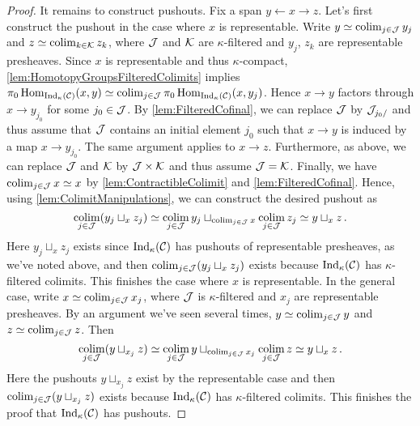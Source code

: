 \begin{proof}
	It remains to construct pushouts. Fix a span $y\leftarrow x\rightarrow z$. Let's first construct the pushout in the case where $x$ is representable. Write $y\simeq \operatorname*{colim}_{j\in\mathcal{J}} y_j$ and $z\simeq \operatorname*{colim}_{k\in\mathcal{K}}z_k$, where $\mathcal{J}$ and $\mathcal{K}$ are $\kappa$-filtered and $y_j$, $z_k$ are representable presheaves. Since $x$ is representable and thus $\kappa$-compact, \cref{lem:HomotopyGroupsFilteredColimits} implies  $\pi_0\operatorname{Hom}_{\mathrm{Ind}_\kappa(\mathcal{C})}(x,y)\simeq \operatorname*{colim}_{j\in\mathcal{J}}\pi_0\operatorname{Hom}_{\mathrm{Ind}_\kappa(\mathcal{C})}(x,y_j)$. Hence $x\rightarrow y$ factors through $x\rightarrow y_{j_0}$ for some $j_0\in \mathcal{J}$. By \cref{lem:FilteredCofinal}, we can replace $\mathcal{J}$ by $\mathcal{J}_{j_0/}$ and thus assume that $\mathcal{J}$ contains an initial element $j_0$ such that $x\rightarrow y$ is induced by a map $x\rightarrow y_{j_0}$. The same argument applies to $x\rightarrow z$. Furthermore, as above, we can replace $\mathcal{J}$ and $\mathcal{K}$ by $\mathcal{J}\times \mathcal{K}$ and thus assume $\mathcal{J}=\mathcal{K}$. Finally, we have $\operatorname*{colim}_{j\in\mathcal{J}}x\simeq x$ by \cref{lem:ContractibleColimit} and \cref{lem:FilteredCofinal}. Hence, using \cref{lem:ColimitManipulations}, we can construct the desired pushout as
	\begin{equation*}
		\operatorname*{colim}_{j\in\mathcal{J}}(y_j\sqcup_xz_j)\simeq \operatorname*{colim}_{j\in \mathcal{J}}y_j\sqcup_{\operatorname*{colim}_{j\in\mathcal{J}}x}\operatorname*{colim}_{j\in\mathcal{J}}z_j\simeq y\sqcup_xz\,.
	\end{equation*}
	Here $y_j\sqcup_xz_j$ exists since $\mathrm{Ind}_\kappa(\mathcal{C})$ has pushouts of representable presheaves, as we've noted above, and then $\operatorname*{colim}_{j\in\mathcal{J}}(y_j\sqcup_xz_j)$ exists because $\mathrm{Ind}_\kappa(\mathcal{C})$ has $\kappa$-filtered colimits. This finishes the case where $x$ is representable. In the general case, write $x\simeq\operatorname*{colim}_{j\in\mathcal{J}}x_j$, where $\mathcal{J}$ is $\kappa$-filtered and $x_j$ are representable presheaves. By an argument we've seen several times, $y\simeq \operatorname*{colim}_{j\in\mathcal{J}}y$ and $z\simeq \operatorname*{colim}_{j\in\mathcal{J}}z$. Then
	\begin{equation*}
		\operatorname*{colim}_{j\in\mathcal{J}}(y\sqcup_{x_j}z)\simeq \operatorname*{colim}_{j\in \mathcal{J}}y\sqcup_{\operatorname*{colim}_{j\in\mathcal{J}}x_j}\operatorname*{colim}_{j\in\mathcal{J}}z\simeq y\sqcup_xz\,.
	\end{equation*}
	Here the pushouts $y\sqcup_{x_j}z$ exist by the representable case and then $\operatorname*{colim}_{j\in\mathcal{J}}(y\sqcup_{x_j}z)$ exists because $\mathrm{Ind}_\kappa(\mathcal{C})$ has $\kappa$-filtered colimits. This finishes the proof that $\mathrm{Ind}_\kappa(\mathcal{C})$ has pushouts.
\end{proof}


